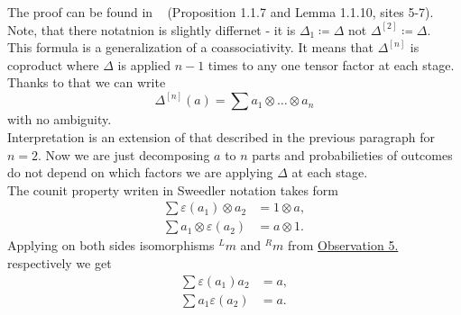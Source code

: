\documentclass[a4paper]{article}
\begin{document}
The proof can be found in ~\cite{DNR} (Proposition 1.1.7 and Lemma 1.1.10, sites 5-7). Note, that there
notatnion is slightly differnet - it is $\Delta_1 \coloneqq \Delta$ not $\Delta^{[2]} \coloneqq \Delta$. \\
This formula is a generalization of a coassociativity. It means that $\Delta^{[n]}$ is coproduct where 
$\Delta$ is applied $n-1$ times to any one tensor factor at each stage. Thanks to that we can write
\begin{equation*}
\Delta^{[n]}(a) = \sum a_1 \otimes \dots \otimes a_n
\end{equation*}
with no ambiguity. \\
Interpretation is an extension of that described in the previous paragraph for $n = 2$. Now we are just
decomposing $a$ to $n$ parts and probabilieties of outcomes do not depend on which factors we are
applying $\Delta$ at each stage.  \\[8pt]
The counit property writen in Sweedler notation takes form
\begin{align*}
\sum\varepsilon(a_1) \otimes a_2 &= 1 \otimes a, \\
\sum a_1 \otimes \varepsilon(a_2) &= a \otimes 1.
\end{align*}
Applying on both sides isomorphisms ${^Lm}$ and ${^Rm}$ from
\hyperref[observation:5]{Observation 5.} respectively we get
\begin{align*}
\sum\varepsilon(a_1)a_2 &= a, \\
\sum a_1\varepsilon(a_2) &= a.
\end{align*}
\end{document}
